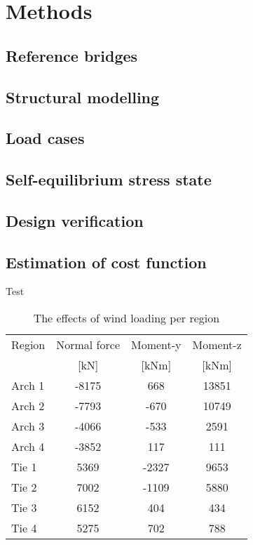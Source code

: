 \section{Methods}\label{sec:methods}
\subsection{Reference bridges}

\subsection{Structural modelling}

\subsection{Load cases}

\subsection{Self-equilibrium stress state}

\subsection{Design verification}

\subsection{Estimation of cost function}


Test


\begin{table}[H] 
\caption{The effects of wind loading per region}
\centering
\begin{tabular}{lccc}
\hline
Region & Normal force & Moment-y & Moment-z \\
 & [kN]   & [kNm] & [kNm] \\ \hline
Arch 1 & -8175 & 668 & 13851\\
Arch 2 & -7793 & -670 & 10749\\
Arch 3 & -4066 & -533 & 2591\\
Arch 4 & -3852 & 117 & 111\\
Tie 1 & 5369 & -2327 & 9653\\
Tie 2 & 7002 & -1109 & 5880\\
Tie 3 & 6152 & 404 & 434\\
Tie 4 & 5275 & 702 & 788\\ \hline
\end{tabular}
\end{table}


